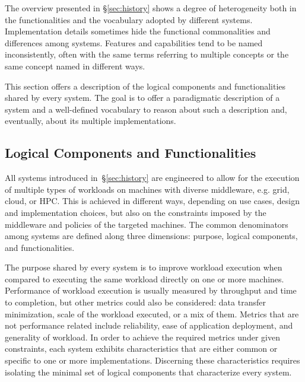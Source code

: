 \documentclass{sig-alternate}
\begin{document}
The overview presented in \S\ref{sec:history} shows a degree of heterogeneity
both in the functionalities and the vocabulary adopted by different \pilotjob
systems. Implementation details sometimes hide the functional commonalities and
differences among \pilotjob systems. Features and capabilities tend to be named
inconsistently, often with the same terms referring to multiple concepts or the
same concept named in different ways.

This section offers a description of the logical components and functionalities
shared by every \pilotjob system. The goal is to offer a paradigmatic
description of a \pilotjob system and a well-defined vocabulary to reason about
such a description and, eventually, about its multiple implementations.


\subsection{Logical Components and Functionalities}
\label{sec:compsandfuncs}

All \pilotjob systems introduced in~\S\ref{sec:history} are engineered to allow
for the execution of multiple types of workloads on machines with diverse
middleware, e.g. grid, cloud, or HPC. This is achieved in different ways,
depending on use cases, design and implementation choices, but also on the
constraints imposed by the middleware and policies of the targeted machines. The
common denominators among \pilotjob systems are defined along three dimensions:
purpose, logical components, and functionalities.

The purpose shared by every \pilotjob system is to improve workload execution
when compared to executing the same workload directly on one or more machines.
Performance of workload execution is usually measured by throughput and time to
completion, but other metrics could also be considered: data transfer
minimization, scale of the workload executed, or a mix of them. Metrics that are
not performance related include reliability, ease of application deployment, and
generality of workload. In order to achieve the required metrics under given
constraints, each \pilotjob system exhibits characteristics that are either
common or specific to one or more implementations. Discerning these
characteristics requires isolating the minimal set of logical components that
characterize every \pilotjob system.
\end{document}
